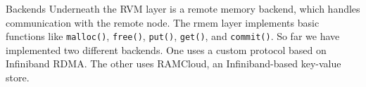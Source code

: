 \begin{block}{Backends}
    Underneath the RVM layer is a remote memory backend, which handles
    communication with the remote node. The rmem layer implements basic
    functions like \texttt{malloc()}, \texttt{free()}, \texttt{put()},
    \texttt{get()}, and \texttt{commit()}. So far we have implemented two
    different backends. One uses a custom protocol based on Infiniband RDMA.
    The other uses RAMCloud, an Infiniband-based key-value store.
\end{block}
